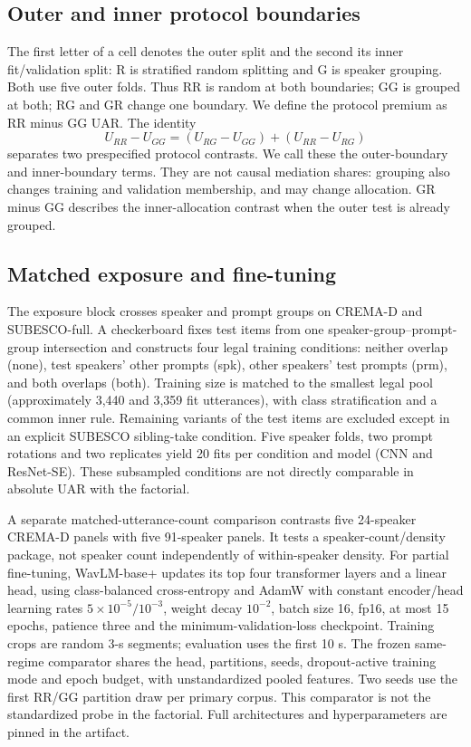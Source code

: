 \documentclass[letterpaper]{article}
\begin{document}
\subsection{Outer and inner protocol boundaries}
The first letter of a cell denotes the outer split and the second its inner fit/validation split: R is stratified random splitting and G is speaker grouping. Both use five outer folds. Thus RR is random at both boundaries; GG is grouped at both; RG and GR change one boundary. We define the protocol premium as RR minus GG UAR. The identity
\begin{equation}
 U_{RR}-U_{GG}=(U_{RG}-U_{GG})+(U_{RR}-U_{RG})
\end{equation}
separates two prespecified protocol contrasts. We call these the outer-boundary and inner-boundary terms. They are not causal mediation shares: grouping also changes training and validation membership, and may change allocation. GR minus GG describes the inner-allocation contrast when the outer test is already grouped.

\subsection{Matched exposure and fine-tuning}
The exposure block crosses speaker and prompt groups on CREMA-D and SUBESCO-full. A checkerboard fixes test items from one speaker-group--prompt-group intersection and constructs four legal training conditions: neither overlap (none), test speakers' other prompts (spk), other speakers' test prompts (prm), and both overlaps (both). Training size is matched to the smallest legal pool (approximately 3,440 and 3,359 fit utterances), with class stratification and a common inner rule. Remaining variants of the test items are excluded except in an explicit SUBESCO sibling-take condition. Five speaker folds, two prompt rotations and two replicates yield 20 fits per condition and model (CNN and ResNet-SE). These subsampled conditions are not directly comparable in absolute UAR with the factorial.

A separate matched-utterance-count comparison contrasts five 24-speaker CREMA-D panels with five 91-speaker panels. It tests a speaker-count/density package, not speaker count independently of within-speaker density. For partial fine-tuning, WavLM-base+ updates its top four transformer layers and a linear head, using class-balanced cross-entropy and AdamW with constant encoder/head learning rates $5\times10^{-5}/10^{-3}$, weight decay $10^{-2}$, batch size 16, fp16, at most 15 epochs, patience three and the minimum-validation-loss checkpoint. Training crops are random 3-s segments; evaluation uses the first 10 s. The frozen same-regime comparator shares the head, partitions, seeds, dropout-active training mode and epoch budget, with unstandardized pooled features. Two seeds use the first RR/GG partition draw per primary corpus. This comparator is not the standardized probe in the factorial. Full architectures and hyperparameters are pinned in the artifact.
\end{document}
